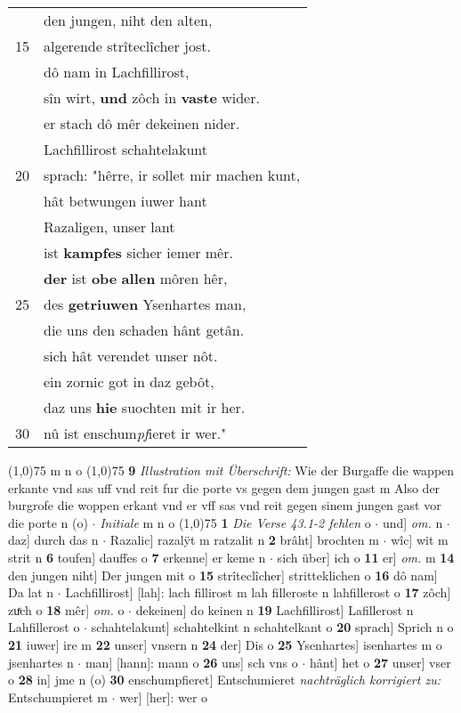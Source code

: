 \documentclass[8pt,a4paper,notitlepage]{article}
\begin{document}
\begin{table}[ht]
\begin{minipage}[t]{0.5\linewidth}
\begin{tabular}{rl}
 & den jungen, niht den alten,\\ 
15 & algerende strîteclîcher jost.\\ 
 & dô nam in Lachfillirost,\\ 
 & sîn wirt, \textbf{und} zôch in \textbf{vaste} wider.\\ 
 & er stach dô mêr dekeinen nider.\\ 
 & Lachfillirost schahtelakunt\\ 
20 & sprach: "hêrre, ir sollet mir machen kunt,\\ 
 & hât betwungen iuwer hant\\ 
 & Razaligen, unser lant\\ 
 & ist \textbf{kampfes} sicher iemer mêr.\\ 
 & \textbf{der} ist \textbf{obe} \textbf{allen} môren hêr,\\ 
25 & des \textbf{getriuwen} Ysenhartes man,\\ 
 & die uns den schaden hânt getân.\\ 
 & sich hât verendet unser nôt.\\ 
 & ein zornic got in daz gebôt,\\ 
 & daz  uns \textbf{hie} suochten mit ir her.\\ 
30 & nû ist enschum\textit{pf}ieret ir wer."\\ 
\end{tabular}
\scriptsize
\line(1,0){75} \newline
m n o \newline
\line(1,0){75} \newline
\textbf{9} \textit{Illustration mit Überschrift:} Wie der Burgaffe die wappen erkante vnd sas uff vnd reit fur die porte vs gegen dem jungen gast m  Also der burgrofe die woppen erkant vnd er vff sas vnd reit gegen sinem jungen gast vor die porte n (o)   $\cdot$ \textit{Initiale} m n o  \newline
\line(1,0){75} \newline
\textbf{1} \textit{Die Verse 43.1-2 fehlen} o   $\cdot$ und] \textit{om.} n  $\cdot$ daz] durch das n  $\cdot$ Razalic] razalÿt m ratzalit n \textbf{2} brâht] brochten m  $\cdot$ wîc] wit m strit n \textbf{6} toufen] dauffes o \textbf{7} erkenne] er keme n  $\cdot$ sich über] ich o \textbf{11} er] \textit{om.} m \textbf{14} den jungen niht] Der jungen mit o \textbf{15} strîteclîcher] stritteklichen o \textbf{16} dô nam] Da lat n  $\cdot$ Lachfillirost] [lah]: lach fillirost m lah filleroste n lahfillerost o \textbf{17} zôch] zuͯch o \textbf{18} mêr] \textit{om.} o  $\cdot$ dekeinen] do keinen n \textbf{19} Lachfillirost] Lafillerost n Lahfillerost o  $\cdot$ schahtelakunt] schahtelkint n schahtelkant o \textbf{20} sprach] Sprich n o \textbf{21} iuwer] ire m \textbf{22} unser] vnsern n \textbf{24} der] Dis o \textbf{25} Ysenhartes] isenhartes m o jsenhartes n  $\cdot$ man] [hann]: mann o \textbf{26} uns] sch vns o  $\cdot$ hânt] het o \textbf{27} unser] vser o \textbf{28} in] jme n (o) \textbf{30} enschumpfieret] Entschumieret \textit{nachträglich korrigiert zu:} Entschumpieret m  $\cdot$ wer] [her]: wer o \newline
\end{minipage}
\end{table}
\end{document}
